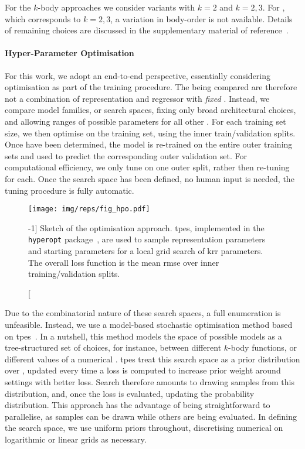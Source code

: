 For the $k$-body approaches we consider variants with $k{=}2$ and $k{=}2,3$. For \soap, which corresponds to $k{=}2,3$, a variation in body-order is not available. Details of remaining \hp choices are discussed in the supplementary material of reference~\cite{lgr2022q}.

\paragraph{Hyper-Parameter Optimisation}
For this work, we adopt an end-to-end perspective, essentially considering \hp optimisation as part of the training procedure. The  being compared are therefore not a combination of representation and regressor with \emph{fixed} \hps. Instead, we compare model families, or search spaces, fixing only broad architectural choices, and allowing ranges of possible parameters for all other \hps. For each training set size, we then optimise \hps on the training set, using the inner train/validation splits. Once \hps have been determined, the model is re-trained on the entire outer training sets and used to predict the corresponding outer validation set. For computational efficiency, we only tune \hps on one outer split, rather then re-tuning for each. Once the search space has been defined, no human input is needed, the \hp tuning procedure is fully automatic.

\begin{figure}
  \centering
  \texttt{[image: img/reps/fig\_hpo.pdf]}
  \caption[][-1\baselineskip]{
  Sketch of the \hp optimisation approach. \Glspl{tpe}, implemented in the \texttt{hyperopt} package~\cite{byc2013m}, are used to sample representation parameters and starting parameters for a local grid search of \gls{krr} parameters. The overall loss function is the mean \gls{rmse} over inner training/validation splits.
  }
  \label{fig:repsbench-hpo}
\end{figure}
\noindent
Due to the combinatorial nature of these search spaces, a full enumeration is unfeasible.
Instead, we use a model-based stochastic optimisation method based on \glspl{tpe}~\cite{bbbk2011m,byc2013m}.
In a nutshell, this method models the space of possible models as a tree-structured set of choices, for instance, between different $k$-body functions, or different values of a numerical \hp.
\Glspl{tpe} treat this search space as a prior distribution over \hps, updated every time a loss is computed to increase prior weight around \hp settings with better loss. Search therefore amounts to drawing samples from this distribution, and, once the loss is evaluated, updating the probability distribution. This approach has the advantage of being straightforward to parallelise, as samples can be drawn while others are being evaluated.
In defining the search space, we use uniform priors throughout, discretising numerical \hps on logarithmic or linear grids as necessary.

